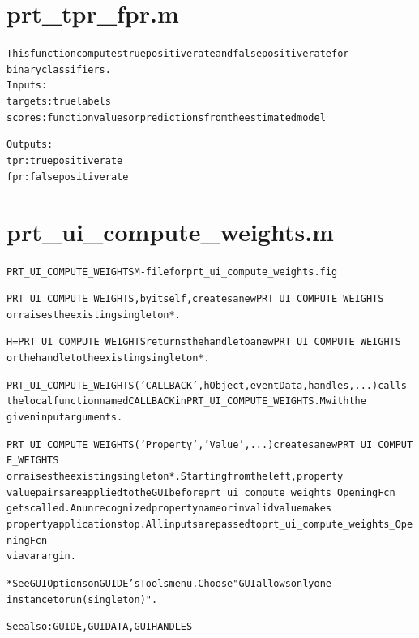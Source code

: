 \section{prt\_tpr\_fpr.m}
\begin{alltt}

 This function computes true positive rate and false positive rate for 
 binary classifiers. 
 Inputs:
        targets: true labels
        scores: function values or predictions from the estimated model

 Outputs:
        tpr: true positive rate
        fpr: false positive rate
\end{alltt}


\section{prt\_ui\_compute\_weights.m}
\begin{alltt}

 PRT\_UI\_COMPUTE\_WEIGHTS M-file for prt\_ui\_compute\_weights.fig
 
 PRT\_UI\_COMPUTE\_WEIGHTS, by itself, creates a new PRT\_UI\_COMPUTE\_WEIGHTS 
 or raises the existing singleton*.
 
 H = PRT\_UI\_COMPUTE\_WEIGHTS returns the handle to a new PRT\_UI\_COMPUTE\_WEIGHTS
 or the handle to the existing singleton*.
 
 PRT\_UI\_COMPUTE\_WEIGHTS('CALLBACK',hObject,eventData,handles,...) calls 
 the local function named CALLBACK in PRT\_UI\_COMPUTE\_WEIGHTS.M with the 
 given input arguments.
 
 PRT\_UI\_COMPUTE\_WEIGHTS('Property','Value',...) creates a new PRT\_UI\_COMPUTE\_WEIGHTS
 or raises the existing singleton*.  Starting from the left, property 
 value pairs are applied to the GUI before prt\_ui\_compute\_weights\_OpeningFcn
 gets called.  An unrecognized property name or invalid value makes 
 property application stop.  All inputs are passed to prt\_ui\_compute\_weights\_OpeningFcn
 via varargin.
 
 *See GUI Options on GUIDE's Tools menu.  Choose "GUI allows only one
  instance to run (singleton)".
 
 See also: GUIDE, GUIDATA, GUIHANDLES
\end{alltt}


